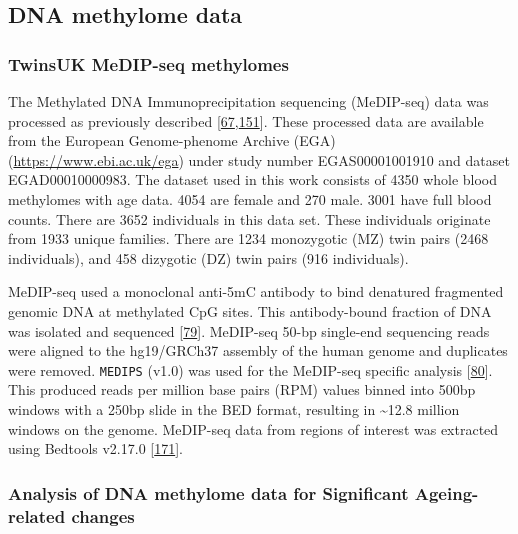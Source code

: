 \documentclass[
]{book}
\begin{document}
\hypertarget{dna-methylome-data}{%
\subsection{DNA methylome data}\label{dna-methylome-data}}

\hypertarget{EpiTwinsMethods}{%
\subsubsection{TwinsUK MeDIP-seq methylomes}\label{EpiTwinsMethods}}

The Methylated DNA Immunoprecipitation sequencing (MeDIP-seq) data was processed as previously described {[}\protect\hyperlink{ref-Bell2017a}{67},\protect\hyperlink{ref-Bell2016}{151}{]}.
These processed data are available from the European Genome-phenome Archive (EGA) (\url{https://www.ebi.ac.uk/ega}) under study number EGAS00001001910 and dataset EGAD00010000983.
The dataset used in this work consists of 4350 whole blood methylomes with age data.
4054 are female and 270 male.
3001 have full blood counts.
There are 3652 individuals in this data set.
These individuals originate from 1933 unique families.
There are 1234 monozygotic (MZ) twin pairs (2468 individuals), and 458 dizygotic (DZ) twin pairs (916 individuals).

MeDIP-seq used a monoclonal anti-5mC antibody to bind denatured fragmented genomic DNA at methylated CpG sites.
This antibody-bound fraction of DNA was isolated and sequenced {[}\protect\hyperlink{ref-Down2009}{79}{]}.
MeDIP-seq 50-bp single-end sequencing reads were aligned to the hg19/GRCh37 assembly of the human genome and duplicates were removed.
\texttt{MEDIPS} (v1.0) was used for the MeDIP-seq specific analysis {[}\protect\hyperlink{ref-Lienhard2014}{80}{]}.
This produced reads per million base pairs (RPM) values binned into 500bp windows with a 250bp slide in the BED format, resulting in \textasciitilde12.8 million windows on the genome.
MeDIP-seq data from regions of interest was extracted using Bedtools v2.17.0 {[}\protect\hyperlink{ref-Quinlan2010}{171}{]}.

\hypertarget{medipmodels}{%
\subsubsection{Analysis of DNA methylome data for Significant Ageing-related changes}\label{medipmodels}}
\end{document}
